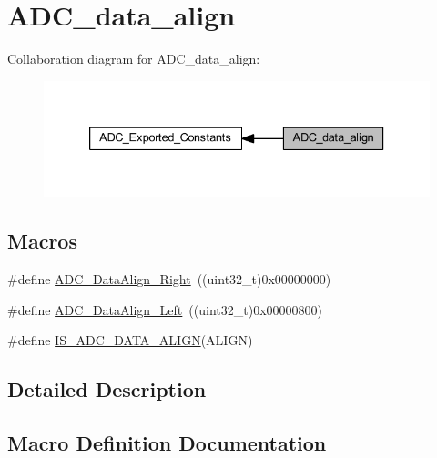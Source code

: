 \hypertarget{group___a_d_c__data__align}{}\section{A\+D\+C\+\_\+data\+\_\+align}
\label{group___a_d_c__data__align}
Collaboration diagram for A\+D\+C\+\_\+data\+\_\+align\+:
\nopagebreak
\begin{figure}[H]
\begin{center}
\leavevmode
\includegraphics[width=333pt]{group___a_d_c__data__align}
\end{center}
\end{figure}
\subsection*{Macros}
\begin{DoxyCompactItemize}
\item 
\#define \hyperlink{group___a_d_c__data__align_ga80b5d2f2b6b058bc498f58e0a92ad035}{A\+D\+C\+\_\+\+Data\+Align\+\_\+\+Right}~((uint32\+\_\+t)0x00000000)
\item 
\#define \hyperlink{group___a_d_c__data__align_ga87c2b7021bc288174d5d6175dc267251}{A\+D\+C\+\_\+\+Data\+Align\+\_\+\+Left}~((uint32\+\_\+t)0x00000800)
\item 
\#define \hyperlink{group___a_d_c__data__align_ga2903b620e3c61dc47ed8c0fbf4197801}{I\+S\+\_\+\+A\+D\+C\+\_\+\+D\+A\+T\+A\+\_\+\+A\+L\+I\+GN}(A\+L\+I\+GN)
\end{DoxyCompactItemize}


\subsection{Detailed Description}


\subsection{Macro Definition Documentation}
\mbox{\label{group___a_d_c__data__align_ga87c2b7021bc288174d5d6175dc267251}} 
